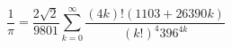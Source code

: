 \[
\frac{1}{\pi} = \frac{2\sqrt{2}}{9801} \sum^\infty_{k=0} \frac{(4k)!(1103+26390k)}{(k!)^4 396^{4k}}
\]